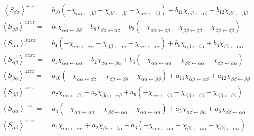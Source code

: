 \begin{align*}\
	\left \langle S_{\beta \alpha} \right \rangle^{xzxz} =&  b_{10} \left( -\chi_{\alpha \alpha \leftarrow \beta \beta} - \chi_{\beta \beta \leftarrow \beta \beta}  -   \chi_{ \alpha \alpha \leftarrow \beta \beta}  \right) + b_{11} \chi_{ \alpha  \beta\leftarrow \alpha \beta } + b_{12}  \chi_{ \beta \beta \leftarrow \beta \beta } \\
	\left \langle S_{\beta \beta} \right \rangle^{xzxz} =&  b_7   \chi_{ \alpha \alpha \leftarrow \beta \beta } - b_8 \chi_{\beta  \alpha \leftarrow \alpha \beta } + b_9 \left(  -\chi_{\alpha \alpha \leftarrow \beta \beta} - \chi_{\beta \beta \leftarrow \beta \beta} -  \chi_{ \beta \beta \leftarrow \beta \beta}  \right)\\
	\left \langle S_{\alpha \alpha} \right \rangle^{xzxz} =&   b_4 \left(  -\chi_{\alpha \alpha \leftarrow \alpha \alpha} - \chi_{\beta \beta \leftarrow \alpha \alpha} -  \chi_{ \alpha \alpha \leftarrow \alpha \alpha} \right) + b_5 \chi_{\alpha \beta \leftarrow \beta \alpha} + b_6 \chi_{\beta \beta \leftarrow \alpha \alpha} \\
	\left \langle S_{\alpha \beta} \right \rangle^{xzxz} =&  b_1  \chi_{\alpha \alpha \leftarrow \alpha \alpha} + b_2 \chi_{\beta \alpha \leftarrow \beta \alpha} + b_3 \left(  -\chi_{\alpha \alpha \leftarrow \alpha \alpha} - \chi_{\beta \beta \leftarrow \alpha \alpha}   -  \chi_{\beta \beta \leftarrow \alpha \alpha} \right) \\
	\left \langle S_{\beta \alpha} \right \rangle^{zzzz} =&  a_{10} \left(  -\chi_{\alpha \alpha \leftarrow \beta \beta} - \chi_{\beta \beta \leftarrow \beta \beta}  -  \chi_{ \alpha \alpha \leftarrow \beta \beta}  \right) + a_{11} \chi_{ \alpha  \beta\leftarrow \alpha \beta } + a_{12}  \chi_{ \beta \beta \leftarrow \beta \beta } \\
	\left \langle S_{\beta \beta} \right \rangle^{zzzz} =&  a_7   \chi_{ \alpha \alpha \leftarrow \beta \beta } + a_8 \chi_{\beta  \alpha \leftarrow \alpha \beta } + a_9 \left( -\chi_{\alpha \alpha \leftarrow \beta \beta} - \chi_{\beta \beta \leftarrow \beta \beta} -  \chi_{ \beta \beta \leftarrow \beta \beta} \right) \\
	\left \langle S_{\alpha \alpha} \right \rangle^{zzzz} =&   a_4 \left(  -\chi_{\alpha \alpha \leftarrow \alpha \alpha} - \chi_{\beta \beta \leftarrow \alpha \alpha}  -  \chi_{ \alpha \alpha \leftarrow \alpha \alpha} \right) + a_5 \chi_{\alpha \beta \leftarrow \beta \alpha} + a_6 \chi_{\beta \beta \leftarrow \alpha \alpha}  \\
	\left \langle S_{\alpha \beta} \right \rangle^{zzzz} =&  a_1  \chi_{\alpha \alpha \leftarrow \alpha \alpha} + a_2 \chi_{\beta \alpha \leftarrow \beta \alpha} + a_3 \left(  -\chi_{\alpha \alpha \leftarrow \alpha \alpha} - \chi_{\beta \beta \leftarrow \alpha \alpha}   -  \chi_{\beta \beta \leftarrow \alpha \alpha} \right)
\end{align*}
